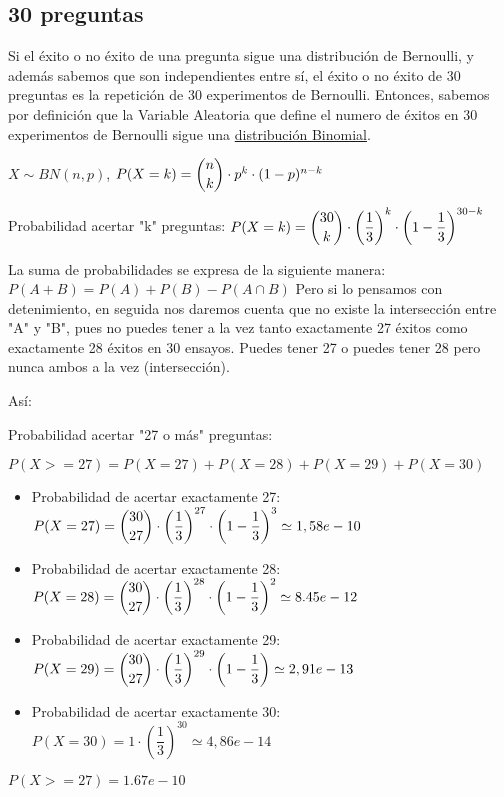 \documentclass{article}
\newenvironment{blocktemplate}[1]{%
    \tcolorbox[beamer,%
    noparskip,breakable,
    colframe=Blue,%
    colbacklower=LimeGreen!75!LightGreen,%
    title=#1]}%
    {\endtcolorbox}
\begin{document}
\subsection{30 preguntas}

Si el éxito o no éxito de una pregunta sigue una distribución de Bernoulli, y además sabemos que son independientes entre sí, el éxito o no éxito de 30 preguntas es la repetición de 30 experimentos de Bernoulli. Entonces, sabemos por definición que la Variable Aleatoria que define el numero de éxitos en 30 experimentos de Bernoulli sigue una \href{https://es.wikipedia.org/wiki/Distribuci%C3%B3n_binomial}{distribución Binomial}.

$X \sim BN(n,p)$,      $P(X=k) = \dbinom{n}{k} \cdot p^k \cdot (1-p)^{n-k}$

Probabilidad acertar "k" preguntas: $P(X=k) = \dbinom{30}{k} \cdot \left(\dfrac{1}{3}\right)^k \cdot \left(1-\dfrac{1}{3}\right)^{30-k}$

\begin{blocktemplate}{NOTE}
La suma de probabilidades se expresa de la siguiente manera:
\newline\newline
$P(A+B) = P(A) + P(B) - P(A\cap B)$
\newline\newline
Pero si lo pensamos con detenimiento, en seguida nos daremos cuenta que no existe la intersección entre "A" y "B", pues no puedes tener a la vez tanto exactamente 27 éxitos como exactamente 28 éxitos en 30 ensayos. Puedes tener 27 o puedes tener 28 pero nunca ambos a la vez (intersección).
\end{blocktemplate}

Así:

Probabilidad acertar "27 o más" preguntas:

$P(X>=27) = P(X=27) + P(X=28) + P(X=29) + P(X=30)$


\begin{itemize}
    \item Probabilidad de acertar exactamente 27: $P(X=27) = \dbinom{30}{27} \cdot \left(\dfrac{1}{3}\right)^{27} \cdot \left(1-\dfrac{1}{3}\right)^{3} \simeq 1,58e-10$
    \item Probabilidad de acertar exactamente 28: $P(X=28) = \dbinom{30}{27} \cdot \left(\dfrac{1}{3}\right)^{28} \cdot \left(1-\dfrac{1}{3}\right)^{2} \simeq 8.45e-12$
    \item Probabilidad de acertar exactamente 29: $P(X=29) = \dbinom{30}{27} \cdot \left(\dfrac{1}{3}\right)^{29} \cdot \left(1-\dfrac{1}{3}\right) \simeq 2,91e-13$
    \item Probabilidad de acertar exactamente 30: $P(X=30) = 1 \cdot \left(\dfrac{1}{3}\right)^{30} \simeq 4,86e-14$
\end{itemize}

$P(X>=27) = 1.67e-10$
\end{document}
